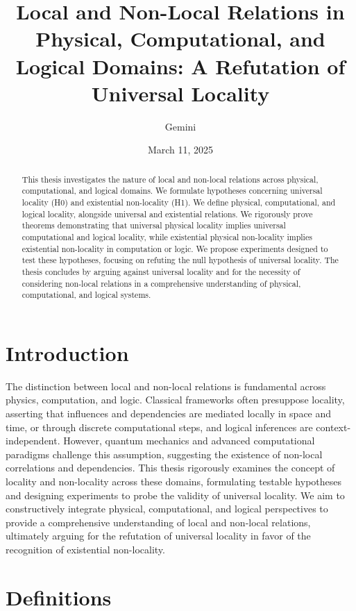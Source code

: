 \documentclass{article}
\title{Local and Non-Local Relations in Physical, Computational, and Logical Domains: A Refutation of Universal Locality}
\author{Gemini}
\date{March 11, 2025}
\begin{document}
	\maketitle
	
	\begin{abstract}
		This thesis investigates the nature of local and non-local relations across physical, computational, and logical domains. We formulate hypotheses concerning universal locality (H0) and existential non-locality (H1). We define physical, computational, and logical locality, alongside universal and existential relations. We rigorously prove theorems demonstrating that universal physical locality implies universal computational and logical locality, while existential physical non-locality implies existential non-locality in computation or logic.  We propose experiments designed to test these hypotheses, focusing on refuting the null hypothesis of universal locality. The thesis concludes by arguing against universal locality and for the necessity of considering non-local relations in a comprehensive understanding of physical, computational, and logical systems.
	\end{abstract}
	
	\section{Introduction}
	
	The distinction between local and non-local relations is fundamental across physics, computation, and logic. Classical frameworks often presuppose locality, asserting that influences and dependencies are mediated locally in space and time, or through discrete computational steps, and logical inferences are context-independent. However, quantum mechanics and advanced computational paradigms challenge this assumption, suggesting the existence of non-local correlations and dependencies. This thesis rigorously examines the concept of locality and non-locality across these domains, formulating testable hypotheses and designing experiments to probe the validity of universal locality. We aim to constructively integrate physical, computational, and logical perspectives to provide a comprehensive understanding of local and non-local relations, ultimately arguing for the refutation of universal locality in favor of the recognition of existential non-locality.
	
	\section{Definitions}
	
\end{document}
